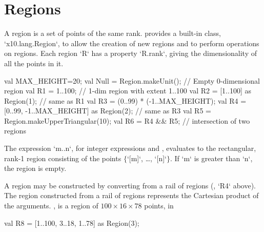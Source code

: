 \section{Regions}\label{XtenRegions}

A region is a set of points of the same rank.  {}\Xten{}
provides a built-in class, \xcd`x10.lang.Region`, to allow the
creation of new regions and to perform operations on regions. 
Each region \xcd`R` has a property \xcd`R.rank`, giving the dimensionality of
all the points in it.

\begin{xten}
val MAX_HEIGHT=20;
val Null = Region.makeUnit();  // Empty 0-dimensional region          
val R1 = 1..100; // 1-dim region with extent 1..100
val R2 = [1..100] as Region(1); // same as R1
val R3 = (0..99) * (-1..MAX_HEIGHT);   
val R4  = [0..99, -1..MAX_HEIGHT] as Region(2); // same as R3  
val R5 = Region.makeUpperTriangular(10);
val R6 = R4 && R5; // intersection of two regions
\end{xten}

The expression \xcdmath`m..n`, for integer expressions  and ,
evaluates to the rectangular, rank-1 region consisting of the points
$\{$\xcdmath`[m]`, \dots, \xcdmath`[n]`$\}$. If \xcdmath`m` is greater than
\xcdmath`n`, the region  is empty.

A region may be constructed by converting from a rail of
regions (\eg, \xcd`R4` above).
The region constructed from a rail of regions represents the Cartesian product
of the arguments. \Eg,  is a region of {$100 \times 16 \times 78$}
points, in
\begin{xten}
  val R8 = [1..100, 3..18, 1..78] as Region(3);
\end{xten}



